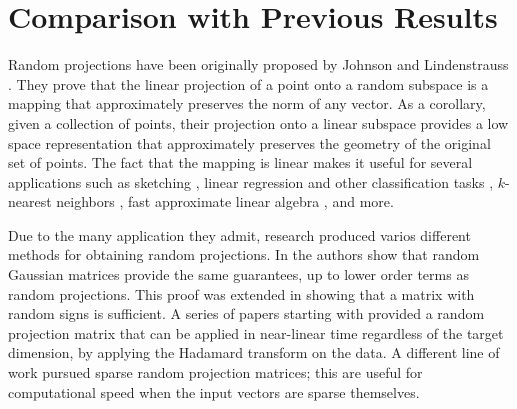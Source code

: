 \documentclass{article}
\theoremstyle{definition}
\theoremstyle{plain}
\begin{document}







\section{Comparison with Previous Results}

Random projections have been originally proposed by Johnson and Lindenstrauss \cite{johnson1984extensions}. They prove that the linear projection of a point onto a random subspace is a mapping that approximately preserves the norm of any vector. As a corollary, given a collection of points, their projection onto a linear subspace provides a low space representation that approximately preserves the geometry of the original set of points. The fact that the mapping is linear makes it useful for several applications such as sketching \cite{alon1999space}, linear regression and other classification tasks \cite{fradkin2003experiments}, $k$-nearest neighbors \cite{andoni2006near}, fast approximate linear algebra \cite{clarkson2009numerical}, and more.

Due to the many application they admit, research produced varios different methods for obtaining random projections. In \cite{dasgupta2003elementary} the authors show that random Gaussian matrices provide the same guarantees, up to lower order terms as random projections. This proof was extended in \cite{achlioptas2003database} showing that a matrix with random signs is sufficient. A series of papers starting with \cite{ailon2009fast} provided a random projection matrix that can be applied in near-linear time regardless of the target dimension, by applying the Hadamard transform on the data. A different line of work \cite{nelson2013osnap} pursued sparse random projection matrices; this are useful for computational speed when the input vectors are sparse themselves.
\end{document}
